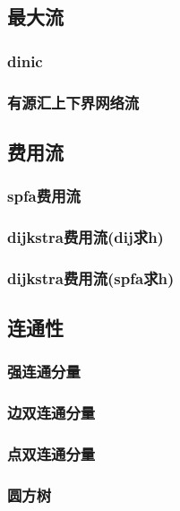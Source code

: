 \documentclass[a4paper,twocolumn]{article}
\begin{document}
\subsection{最大流}
\subsubsection{dinic}

\subsubsection{有源汇上下界网络流}

\subsection{费用流}
\subsubsection{spfa费用流}

\subsubsection{dijkstra费用流(dij求h)}

\subsubsection{dijkstra费用流(spfa求h)}

\subsection{连通性}
\subsubsection{强连通分量}

\subsubsection{边双连通分量}

\subsubsection{点双连通分量}

\subsubsection{圆方树}

\end{document}
